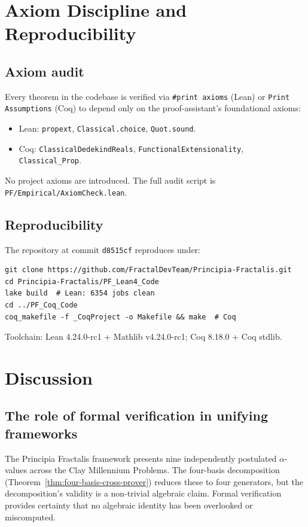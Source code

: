 \documentclass[11pt,a4paper]{article}
\theoremstyle{definition}
\begin{document}
\section{Axiom Discipline and Reproducibility}

\subsection{Axiom audit}

Every theorem in the codebase is verified via \texttt{\#print axioms}
(Lean) or \texttt{Print Assumptions} (Coq) to depend only on the
proof-assistant's foundational axioms:
\begin{itemize}
\item Lean: \texttt{propext}, \texttt{Classical.choice}, \texttt{Quot.sound}.
\item Coq: \texttt{ClassicalDedekindReals}, \texttt{FunctionalExtensionality},
\texttt{Classical\_Prop}.
\end{itemize}
No project axioms are introduced. The full audit script is
\texttt{PF/Empirical/AxiomCheck.lean}.

\subsection{Reproducibility}

The repository at commit \texttt{d8515cf} reproduces under:
\begin{lstlisting}
git clone https://github.com/FractalDevTeam/Principia-Fractalis.git
cd Principia-Fractalis/PF_Lean4_Code
lake build  # Lean: 6354 jobs clean
cd ../PF_Coq_Code
coq_makefile -f _CoqProject -o Makefile && make  # Coq
\end{lstlisting}
Toolchain: Lean 4.24.0-rc1 + Mathlib v4.24.0-rc1; Coq 8.18.0 + Coq stdlib.

\section{Discussion}

\subsection{The role of formal verification in unifying frameworks}

The Principia Fractalis framework presents nine independently postulated
$\alpha$-values across the Clay Millennium Problems. The four-basis
decomposition (Theorem~\ref{thm:four-basis-cross-prover}) reduces these
to four generators, but the decomposition's validity is a non-trivial
algebraic claim. Formal verification provides certainty that no
algebraic identity has been overlooked or miscomputed.
\end{document}
